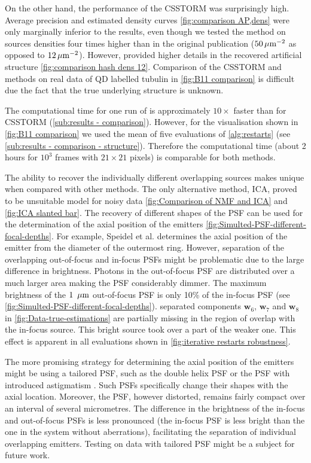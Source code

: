 On the other hand, the performance of the CSSTORM was surprisingly high. Average precision and estimated density curves \autoref{fig:comparison AP,dens} were only marginally inferior to the \inmf{} results, even though we tested the method on sources densities four times higher than in the original publication \cite{Zhu2012} ($50 \, \mathrm{\mu m}^{-2}$ as opposed to $12 \, \mathrm{\mu m}^{-2}$). However, \inmf{} provided higher details in the recovered artificial structure \autoref{fig:comparison hash dens 12}. Comparison of the CSSTORM and \inmf{} methods on real data of QD labelled tubulin in \autoref{fig:B11 comparison} is difficult due the fact that the true underlying structure is unknown. 

The computational time for one run of \inmf{} is approximately $10\times$ faster than for CSSTORM (\autoref{sub:results - comparison}). However, for the visualisation shown in \autoref{fig:B11 comparison} we used the mean of five evaluations of \autoref{alg:restarts} (see \autoref{sub:results - comparison - structure}). Therefore the computational time (about 2 hours for  $10^3$ frames with $21 \times 21$ pixels) is comparable for both methods. 

The ability to recover the individually different overlapping sources makes \inmf{} unique when compared with other methods. The only alternative method, ICA, proved to be unsuitable model for noisy data \autoref{fig:Comparison of NMF and ICA} and \ref{fig:ICA slanted bar}. The recovery of different shapes of the PSF can be used for the determination of the axial position of the emitters \autoref{fig:Simulted-PSF-different-focal-depths}. For example, Speidel et al. \cite{Speidel2003} determines the axial position of the emitter from the diameter of the outermost ring. However, separation of the overlapping out-of-focus and in-focus PSFs might be problematic due to the large difference in brightness. Photons in the out-of-focus PSF are distributed over a much larger area making the PSF considerably dimmer. The maximum brightness of the $1\ \um$ out-of-focus PSF is only 10\% of the in-focus PSF (see \autoref{fig:Simulted-PSF-different-focal-depths}). \inmf{} separated components $\bm{w}_6$, $\bm{w}_7$ and $\bm{w}_8$ in \autoref{fig:Data-true-estimations}\ddd{} are partially missing in the region of overlap with the in-focus source. This bright source took over a part of the weaker one. This effect is apparent in all evaluations shown in \autoref{fig:iterative restarts robustness}.

The more promising strategy for determining the axial position of the emitters might be using a tailored PSF, such as the double helix PSF \cite{Quirin2011} or the PSF with introduced astigmatism \cite{Huang2008}. Such PSFs specifically change their shapes with the axial location. Moreover, the PSF, however distorted, remains fairly compact over an interval of several micrometres. The difference in the brightness of the in-focus and out-of-focus PSFs is less pronounced (the in-focus PSF is less bright than the one in the system without aberrations), facilitating the separation of individual overlapping emitters. Testing \inmf{} on data with tailored PSF \cite{Huang2008,Quirin2011} might be a subject for future work. 

